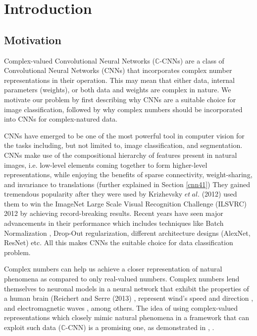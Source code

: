 \chapter{Introduction} \label{chap:intro}

\section{Motivation} \label{sect:moti}

Complex-valued Convolutional Neural Networks ($\mathbb{C}$-CNNs) are a class of Convolutional Neural Networks (CNNs) that incorporates complex number representations in their operation. This may mean that either data, internal parameters (weights), or both data and weights are complex in nature. We motivate our problem by first describing why CNNs are a suitable choice for image classification, followed by why complex numbers should be incorporated into CNNs for complex-natured data.

CNNs have emerged to be one of the most powerful tool in computer vision for the tasks including, but not limited to, image classification, and segmentation. CNNs make use of the compositional hierarchy of features present in natural images, i.e. low-level elements coming together to form higher-level representations, while enjoying the benefits of sparse connectivity, weight-sharing, and invariance to translations (further explained in Section \ref{cnn41})  They gained tremendous popularity after they were used by Krizhevsky $et \ al.$ (2012) \cite{krizhevsky2012imagenet} used them to win the ImageNet Large Scale Visual Recognition Challenge (ILSVRC) 2012 by achieving record-breaking results. Recent years have seen major advancements in their performance which includes techniques like Batch Normalization \cite{bnIoffeS15}, Drop-Out regularization, different architecture designs (AlexNet, ResNet) etc. All this makes CNNs the suitable choice for data classification problem.

Complex numbers can help us achieve a closer representation of natural phenomena as compared to only real-valued numbers. Complex numbers lend themselves to neuronal models in a neural network that exhibit the properties of a human brain (Reichert and Serre (2013) \cite{reichert2013neuronal}, represent wind's speed and direction \cite{wind}, and electromagnetic waves \cite{hirose2012complex}, among others. The idea of using complex-valued representations which closely mimic natural phenomena in a framework that can exploit such data ($\mathbb{C}$-CNN) is a promising one, as demonstrated in \cite{wind}, \cite{polsarzhang2017complex}.

